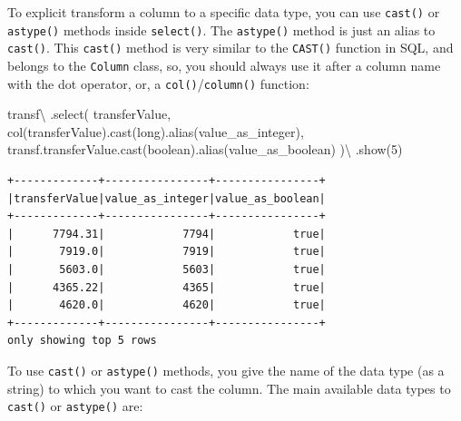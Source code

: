 \documentclass[
  11pt,
  letterpaper,
  DIV=11,
  numbers=noendperiod]{scrreprt}
\newenvironment{Shaded}{\begin{snugshade}}{\end{snugshade}}
\newcommand{\DecValTok}[1]{\textcolor[rgb]{0.68,0.00,0.00}{#1}}
\newcommand{\NormalTok}[1]{\textcolor[rgb]{0.00,0.23,0.31}{#1}}
\newcommand{\OperatorTok}[1]{\textcolor[rgb]{0.37,0.37,0.37}{#1}}
\newcommand{\StringTok}[1]{\textcolor[rgb]{0.13,0.47,0.30}{#1}}
\begin{document}
To explicit transform a column to a specific data type, you can use
\texttt{cast()} or \texttt{astype()} methods inside \texttt{select()}.
The \texttt{astype()} method is just an alias to \texttt{cast()}. This
\texttt{cast()} method is very similar to the \texttt{CAST()} function
in SQL, and belongs to the \texttt{Column} class, so, you should always
use it after a column name with the dot operator, or, a
\texttt{col()}/\texttt{column()} function:

\begin{Shaded}
\begin{Highlighting}[]
\NormalTok{transf}\OperatorTok{\textbackslash{}}
\NormalTok{  .select(}
    \StringTok{\textquotesingle{}transferValue\textquotesingle{}}\NormalTok{,}
\NormalTok{    col(}\StringTok{\textquotesingle{}transferValue\textquotesingle{}}\NormalTok{).cast(}\StringTok{\textquotesingle{}long\textquotesingle{}}\NormalTok{).alias(}\StringTok{\textquotesingle{}value\_as\_integer\textquotesingle{}}\NormalTok{),}
\NormalTok{    transf.transferValue.cast(}\StringTok{\textquotesingle{}boolean\textquotesingle{}}\NormalTok{).alias(}\StringTok{\textquotesingle{}value\_as\_boolean\textquotesingle{}}\NormalTok{)}
\NormalTok{  )}\OperatorTok{\textbackslash{}}
\NormalTok{  .show(}\DecValTok{5}\NormalTok{)}
\end{Highlighting}
\end{Shaded}

\begin{verbatim}
+-------------+----------------+----------------+
|transferValue|value_as_integer|value_as_boolean|
+-------------+----------------+----------------+
|      7794.31|            7794|            true|
|       7919.0|            7919|            true|
|       5603.0|            5603|            true|
|      4365.22|            4365|            true|
|       4620.0|            4620|            true|
+-------------+----------------+----------------+
only showing top 5 rows
\end{verbatim}

To use \texttt{cast()} or \texttt{astype()} methods, you give the name
of the data type (as a string) to which you want to cast the column. The
main available data types to \texttt{cast()} or \texttt{astype()} are:
\end{document}
